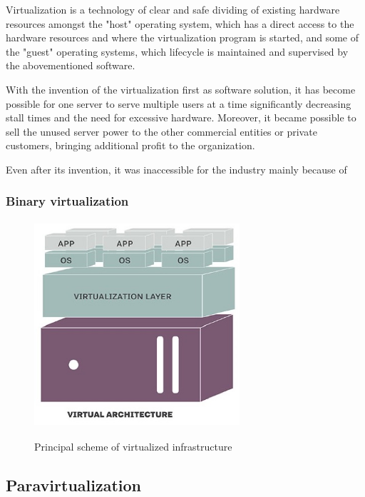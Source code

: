 \begin{definition}
Virtualization is a technology of clear and safe dividing
of existing hardware resources amongst the "host" operating system,
which has a direct access to the hardware resources and where the
virtualization program is started, and some of the "guest" operating systems,
which lifecycle is maintained and supervised by the abovementioned software.
\end{definition}

With the invention of the virtualization first as software solution,
it has become possible for one server to serve multiple users at a time
significantly decreasing stall times and the need for excessive hardware.
Moreover, it became possible to sell the unused
server power to the other commercial entities or private customers,
bringing additional profit to the organization.

Even after its invention, it was inaccessible
for the industry mainly because of

\subsubsection{Binary virtualization}







\begin{figure}
\includegraphics[height=3in, width=3in]{virtualized}
\caption{Principal scheme of virtualized infrastructure}
\cite{TraditionalAndVirtualInfra}
\end{figure}

\subsection{Paravirtualization}

